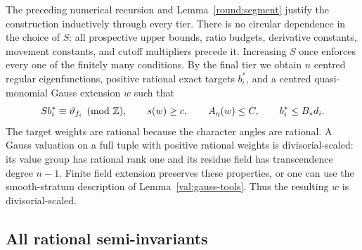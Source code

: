The preceding numerical recursion and Lemma~\ref{round:segment}
justify the construction inductively through every tier.
There is no circular dependence in the choice of $S$:
all prospective upper bounds, ratio budgets, derivative
constants, movement constants, and cutoff multipliers precede
it. Increasing $S$ once enforces every one of the finitely
many conditions. By the final tier we obtain $n$ centred
regular eigenfunctions, positive rational exact targets
$b_i^*$, and a centred quasi-monomial Gauss extension $w$
such that
\begin{equation}\label{round:final-bounds}
 S b_i^*\equiv\vartheta_{f_i}\pmod{\mathbb Z},\qquad
 s(w)\ge c,\qquad A_\eta(w)\le C,\qquad
 b_i^*\le B_*d_i.
\end{equation}
The target weights are rational because the character angles
are rational. A Gauss valuation on a full tuple with positive
rational weights is divisorial-scaled: its value group has
rational rank one and its residue field has transcendence
degree $n-1$. Finite field extension preserves these
properties, or one can use the smooth-stratum description
of Lemma~\ref{val:gauss-tools}. Thus the resulting $w$ is
divisorial-scaled.

\subsection{All rational semi-invariants}


